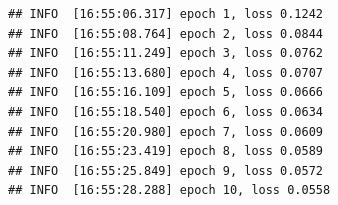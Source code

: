 \documentclass[
  shownotes,
  xcolor={svgnames},
  hyperref={colorlinks,citecolor=DarkBlue,linkcolor=DarkRed,urlcolor=DarkBlue}
  , aspectratio=169]{beamer}
\begin{document}
\begin{frame}[fragile]
\begin{scriptsize}
\end{scriptsize}
\begin{tiny}


\begin{verbatim}
## INFO  [16:55:06.317] epoch 1, loss 0.1242 
## INFO  [16:55:08.764] epoch 2, loss 0.0844 
## INFO  [16:55:11.249] epoch 3, loss 0.0762 
## INFO  [16:55:13.680] epoch 4, loss 0.0707 
## INFO  [16:55:16.109] epoch 5, loss 0.0666 
## INFO  [16:55:18.540] epoch 6, loss 0.0634 
## INFO  [16:55:20.980] epoch 7, loss 0.0609 
## INFO  [16:55:23.419] epoch 8, loss 0.0589 
## INFO  [16:55:25.849] epoch 9, loss 0.0572 
## INFO  [16:55:28.288] epoch 10, loss 0.0558
\end{verbatim}
\end{tiny}
\end{frame}
\end{document}
